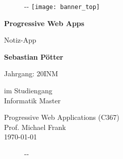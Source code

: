 
\begin{titlepage}
    
    \begin{figure}[t]
        \begin{adjustwidth}{-\oddsidemargin-1in}{-\rightmargin}
            \centering
            \texttt{[image: banner\_top]}
        \end{adjustwidth}
    \end{figure}

    \begin{flushleft}
        \vspace*{1cm}
        \Huge
        \textbf{Progressive Web Apps}
        
        \vspace{0.5cm}
        \LARGE
        Notiz-App
        
        \vspace{1.5cm}
        \textbf{Sebastian Pötter}
        
        \vspace{0.5cm}
        \large
        Jahrgang: 20INM
        
        \vspace{0.5cm}
        im Studiengang\\
        Informatik Master
        
    \end{flushleft}        

    \vspace{0.5cm}
    \begin{flushright}
        Progressive Web Applications (C367)\\
        Prof. Michael Frank\\
        \vspace{0.5cm}
        \today
    \end{flushright}    
    
    \begin{figure}[b]
        \begin{adjustwidth}{-\oddsidemargin-1in}{-\rightmargin}
            \centering
        \end{adjustwidth}
    \end{figure}

\end{titlepage}

\restoregeometry